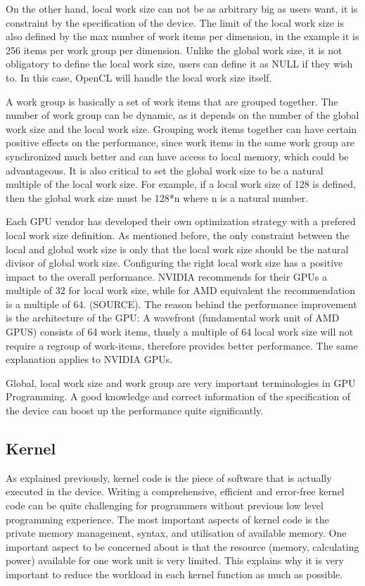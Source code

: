 On the other hand, local work size can not be as arbitrary big as users want, it is constraint by the specification of the device. The limit of the local work size is also defined by the max number of work items per dimension, in the example it is 256 items per work group per dimension. Unlike the global work size, it is not obligatory to define the local work size, users can define it as NULL if they wish to. In this case, OpenCL will handle the local work size itself.

A work group is basically a set of work items that are grouped together. The number of work group can be dynamic, as it depends on the number of the global work size and the local work size. Grouping work items together can have certain positive effects on the performance, since work items in the same work group are synchronized much better and can have access to local memory, which could be advantageous. It is also critical to set the global work size to be a natural multiple of the local work size. For example, if a local work size of 128 is defined, then the global work size must be 128*n where n is a natural number.

Each GPU vendor has developed their own optimization strategy with a prefered local work size definition. As mentioned before, the only constraint between the local and global work size is only that the local work size should be the natural divisor of global work size. Configuring the right local work size has a positive impact to the overall performance. NVIDIA recommends for their GPUs a multiple of 32 for local work size, while for AMD equivalent the recommendation is a multiple of 64. (SOURCE). The reason behind the performance improvement is the architecture of the GPU: A wavefront (fundamental work unit of AMD GPUS) consists of 64 work items, thusly a multiple of 64 local work size will not require a regroup of work-items, therefore provides better performance. The same explanation applies to NVIDIA GPUs.

Global, local work size and work group are very important terminologies in GPU Programming. A good knowledge and correct information of the specification of  the device can boost up the performance quite significantly.
\newpage

\subsection{Kernel}

As explained previously, kernel code is the piece of software that is actually executed in the device. Writing a comprehensive, efficient and error-free kernel code can be quite challenging for programmers without previous low level programming experience. The most important aspects of kernel code is the private memory management, syntax, and utilisation of available memory. One important aspect to be concerned about is that the resource (memory, calculating power) available for one work unit is very limited. This explains why it is very important to reduce the workload in each kernel function as much as possible.

